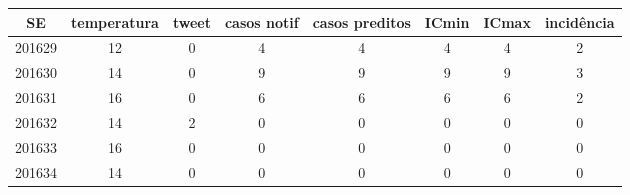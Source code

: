 \begin{tabular}{c|ccccccc}
  \hline
SE & temperatura & tweet & casos notif & casos preditos & ICmin & ICmax & incidência \\ 
  \hline
201629 & 12 & 0 & 4 & 4 & 4 & 4 & 2 \\ 
  201630 & 14 & 0 & 9 & 9 & 9 & 9 & 3 \\ 
  201631 & 16 & 0 & 6 & 6 & 6 & 6 & 2 \\ 
  201632 & 14 & 2 & 0 & 0 & 0 & 0 & 0 \\ 
  201633 & 16 & 0 & 0 & 0 & 0 & 0 & 0 \\ 
  201634 & 14 & 0 & 0 & 0 & 0 & 0 & 0 \\ 
   \hline
\end{tabular}
